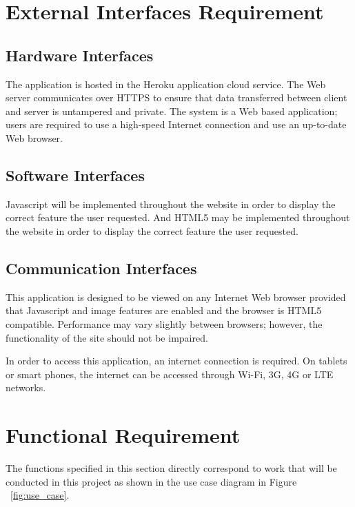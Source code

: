 
\section{External Interfaces Requirement}

\subsection{Hardware Interfaces}

The application is hosted in the Heroku application cloud service. The Web server communicates over HTTPS to ensure that data transferred between client and server is untampered and private. The system is a Web based application; users are required to use a high-speed Internet connection and use an up-to-date Web browser.

\subsection{Software Interfaces}

Javascript will be implemented throughout the website in order to display the correct feature the user requested. And HTML5 may be implemented throughout the website in order to display the correct feature the user requested.

\subsection{Communication Interfaces}

This application is designed to be viewed on any Internet Web browser provided that Javascript and image features are enabled and the browser is HTML5 compatible. Performance may vary slightly between browsers; however, the functionality of the site should not be impaired.

In order to access this application, an internet connection is required. On tablets or smart phones, the internet can be accessed through Wi-Fi, 3G, 4G or LTE networks.

\section{Functional Requirement}

The functions specified in this section directly correspond to work that will be conducted in this project as shown in the use case diagram in Figure ~\ref{fig:use_case}. 

